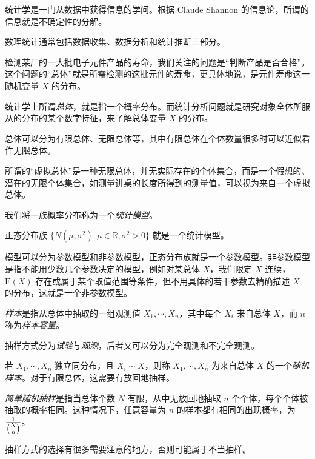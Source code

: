 \documentclass[../main.tex]{subfiles}
\begin{document}
统计学是一门从数据中获得信息的学问。根据 Claude Shannon 的信息论，所谓的信息就是不确定性的分解。

数理统计通常包括数据收集、数据分析和统计推断三部分。


\begin{example*}
    检测某厂的一大批电子元件产品的寿命，我们关注的问题是“判断产品是否合格”。这个问题的“总体”就是所需检测的这批元件的寿命，更具体地说，是元件寿命这一随机变量 $X$ 的分布。
\end{example*}

统计学上所谓\emph{总体}，就是指一个概率分布。而统计分析问题就是研究对象全体所服从的分布的某个数字特征，来了解总体变量 $X$ 的分布。

总体可以分为有限总体、无限总体等，其中有限总体在个体数量很多时可以近似看作无限总体。

所谓的“虚拟总体”是一种无限总体，并无实际存在的个体集合，而是一个假想的、潜在的无限个体集合，如测量讲桌的长度所得到的测量值，可以视为来自一个虚拟总体。

我们将一族概率分布称为一个\emph{统计模型}。

\begin{example*}
    正态分布族 $\{N(\mu,\sigma^2):\mu\in\mathbb R,\sigma^2>0\}$ 就是一个统计模型。
\end{example*}

模型可以分为参数模型和非参数模型，正态分布族就是一个参数模型。非参数模型是指不能用少数几个参数决定的模型，例如对某总体 $X$，我们限定 $X$ 连续，$\mathrm E(X)$ 存在或属于某个取值范围等条件，但不用具体的若干参数去精确描述 $X$ 的分布，这就是一个非参数模型。

\emph{样本}是指从总体中抽取的一组观测值 $X_1,\cdots,X_n$，其中每个 $X_i$ 来自总体 $X$，而 $n$ 称为\emph{样本容量}。

抽样方式分为\emph{试验}与\emph{观测}，后者又可以分为完全观测和不完全观测。


若 $X_1,\cdots,X_n$ 独立同分布，且 $X_i\sim X$，则称 $X_1,\cdots,X_n$ 为来自总体 $X$ 的一个\emph{随机样本}。对于有限总体，这需要有放回地抽样。

\emph{简单随机抽样}是指当总体个数 $N$ 有限，从中无放回地抽取 $n$ 个个体，每个个体被抽取的概率相同。这种情况下，任意容量为 $n$ 的样本都有相同的出现概率，为 $\frac1{\tbinom Nn}$。

抽样方式的选择有很多需要注意的地方，否则可能属于不当抽样。
\end{document}
